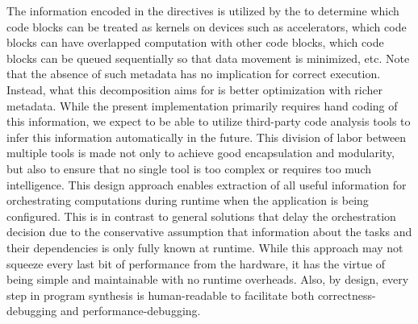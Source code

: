 The information encoded in the directives is utilized by the \CT to
determine which code blocks can be treated as kernels on devices  such
as accelerators, which code blocks can have overlapped computation
with other code blocks, which code blocks can be queued sequentially
so that data movement is minimized, etc. Note that the absence of such
metadata has no implication for correct execution. Instead, what this
decomposition aims for is better optimization with richer
metadata. While the present implementation primarily requires hand
coding of this information, we expect to be able to utilize
third-party code analysis tools to infer this information
automatically in the future. This division of labor between multiple
tools is made not only to achieve good encapsulation and modularity,
but also to ensure that no single tool is too complex or requires too
much intelligence. This design approach enables extraction of all
useful information for orchestrating computations during runtime when
the application is being configured. This is in contrast to general
solutions that delay the orchestration decision due to the
conservative assumption that information about the tasks and their
dependencies is only fully known at runtime. While this approach may
not squeeze every last bit of performance from the hardware, it has
the virtue of being simple and maintainable with no runtime
overheads. Also, by design, every step in program synthesis is
human-readable to facilitate both correctness-debugging and
performance-debugging.



